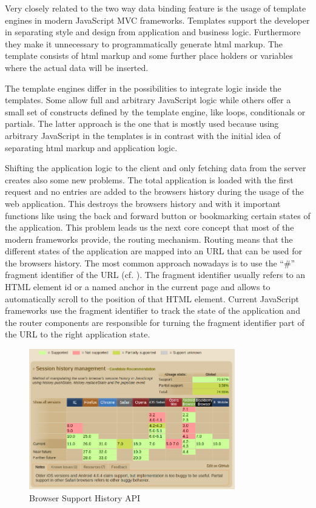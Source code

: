 Very closely related to the two way data binding feature is the usage of template engines in modern JavaScript MVC frameworks.
Templates support the developer in separating style and design from application and business logic.
Furthermore they make it unnecessary to programmatically generate html markup.
The template consists of html markup and some further place holders or variables where the actual data will be inserted.

The template engines differ in the possibilities to integrate logic inside the templates.
Some allow full and arbitrary JavaScript logic while others offer a small set of constructs defined by the template engine, like loops, conditionals or partials.
The latter approach is the one that is mostly used because using arbitrary JavaScript in the templates is in contrast with the initial idea of separating html markup and application logic.

Shifting the application logic to the client and only fetching data from the server creates also some new problems.
The total application is loaded with the first request and no entries are added to the browsers history during the usage of the web application.
This destroys the browsers history and with it important functions like using the back and forward button or bookmarking certain states of the application.
This problem leads us the next core concept that most of the modern frameworks provide, the routing mechanism.
Routing means that the different states of the application are mapped into an URL that can be used for the browsers history.
The most common approach nowadays is to use the \enquote{\#} fragment identifier of the URL (cf. \autocite{spi_manifesto}).
The fragment identifier usually refers to an HTML element id or a named anchor in the current page and allows to automatically scroll to the position of that HTML element.
Current JavaScript frameworks use the fragment identifier to track the state of the application and the router components are responsible for turning the fragment identifier part of the URL to the right application state.

\begin{figure}
	\centering \includegraphics[width=0.8\textwidth]{./img/web-dev/usage_history_api.png}
	\caption{Browser Support History API \autocite{can_i_use}}
	\label{fig:usage_history_api}
\end{figure}


